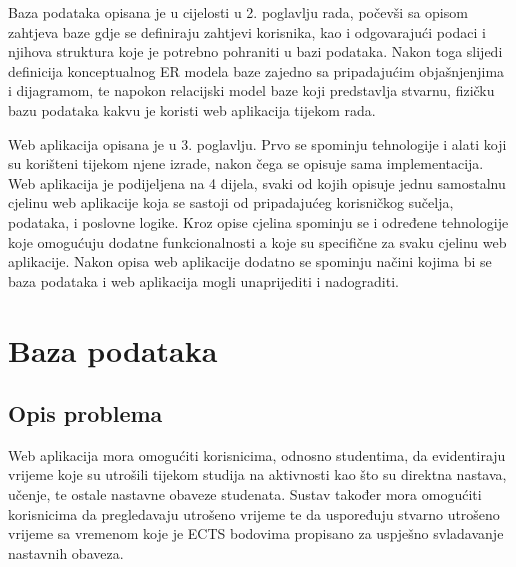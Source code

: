 \documentclass[times, utf8, zavrsni]{fer}
\begin{document}
Baza podataka opisana je u cijelosti u 2. poglavlju rada, počevši sa opisom zahtjeva baze gdje se definiraju zahtjevi korisnika, kao i odgovarajući podaci i njihova struktura koje je potrebno pohraniti u bazi podataka. Nakon toga slijedi definicija konceptualnog ER modela baze zajedno sa pripadajućim objašnjenjima i dijagramom, te napokon relacijski model baze koji predstavlja stvarnu, fizičku bazu podataka kakvu je koristi web aplikacija tijekom rada.

Web aplikacija opisana je u 3. poglavlju. Prvo se spominju tehnologije i alati koji su korišteni tijekom njene izrade, nakon čega se opisuje sama implementacija. Web aplikacija je podijeljena na 4 dijela, svaki od kojih opisuje jednu samostalnu cjelinu web aplikacije koja se sastoji od pripadajućeg korisničkog sučelja, podataka, i poslovne logike. Kroz opise cjelina spominju se i određene tehnologije koje omogućuju dodatne funkcionalnosti a koje su specifične za svaku cjelinu web aplikacije. Nakon opisa web aplikacije dodatno se spominju načini kojima bi se baza podataka i web aplikacija mogli unaprijediti i nadograditi.

\chapter{Baza podataka}

\section{Opis problema}
Web aplikacija mora omogućiti korisnicima, odnosno studentima, da evidentiraju vrijeme koje su utrošili tijekom studija na aktivnosti kao što su direktna nastava, učenje, te ostale nastavne obaveze studenata. Sustav također mora omogućiti korisnicima da pregledavaju utrošeno vrijeme te da uspoređuju stvarno utrošeno vrijeme sa vremenom koje je ECTS bodovima propisano za uspješno svladavanje nastavnih obaveza.
\end{document}
